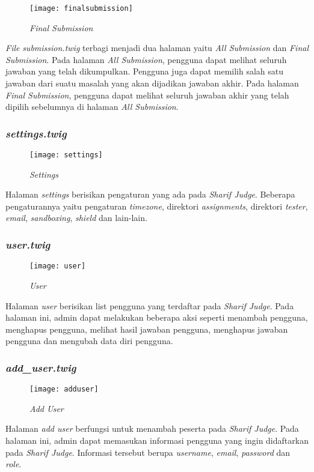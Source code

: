 \begin{figure}[H]
	\centering  
	\texttt{[image: finalsubmission]}  
	\caption[\textit{Final Submission}]{\textit{Final Submission}} 
	\label{fig:finalsubmission} 
\end{figure} 

\textit{File} \textit{submission.twig} terbagi menjadi dua halaman yaitu \textit{All Submission} dan \textit{Final Submission}. Pada halaman \textit{All Submission}, pengguna dapat melihat seluruh jawaban yang telah dikumpulkan. Pengguna juga dapat memilih salah satu jawaban dari suatu masalah yang akan dijadikan jawaban akhir. Pada halaman \textit{Final Submission}, pengguna dapat melihat seluruh jawaban akhir yang telah dipilih sebelumnya di halaman \textit{All Submission}.

\subsubsection{\textit{settings.twig}}
\begin{figure}[H]
	\centering  
	\texttt{[image: settings]}  
	\caption[\textit{Settings}]{\textit{Settings}} 
	\label{fig:settings} 
\end{figure} 
Halaman \textit{settings} berisikan pengaturan yang ada pada \textit{Sharif Judge}. Beberapa pengaturannya yaitu pengaturan \textit{timezone}, direktori \textit{assignments}, direktori \textit{tester}, \textit{email}, \textit{sandboxing}, \textit{shield} dan lain-lain.

\subsubsection{\textit{user.twig}}
\begin{figure}[H]
	\centering  
	\texttt{[image: user]}  
	\caption[\textit{User}]{\textit{User}} 
	\label{fig:user} 
\end{figure} 
Halaman \textit{user} berisikan list pengguna yang terdaftar pada \textit{Sharif Judge}. Pada halaman ini, admin dapat melakukan beberapa aksi seperti menambah pengguna, menghapus pengguna, melihat hasil jawaban pengguna, menghapus jawaban pengguna dan mengubah data diri pengguna. 

\subsubsection{\textit{add\_user.twig}}
\begin{figure}[H]
	\centering  
	\texttt{[image: adduser]}  
	\caption[\textit{Add User}]{\textit{Add User}} 
	\label{fig:adduser} 
\end{figure} 
Halaman \textit{add user} berfungsi untuk menambah peserta pada \textit{Sharif Judge}. Pada halaman ini, admin dapat memasukan informasi pengguna yang ingin didaftarkan pada \textit{Sharif Judge}. Informasi tersebut berupa \textit{username}, \textit{email}, \textit{password} dan \textit{role}.

